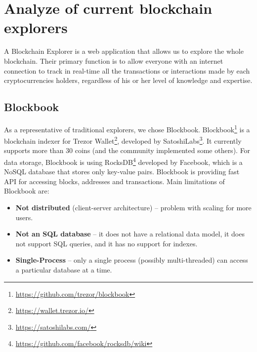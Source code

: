 \section{Analyze of current blockchain explorers}
A Blockchain Explorer is a web application that allows us to explore the whole blockchain. Their primary function is to allow everyone with an internet connection to track in real-time all the transactions or interactions made by each cryptocurrencies holders, regardless of his or her level of knowledge and expertise.\cite{laurence2019blockchain}\cite{dhillon2017blockchain}


\subsection{Blockbook}
As a representative of traditional explorers, we chose Blockbook. Blockbook\footnote{\url{https://github.com/trezor/blockbook}} is a blockchain indexer for Trezor Wallet\footnote{\url{https://wallet.trezor.io/}}, developed by SatoshiLabs\footnote{\url{https://satoshilabs.com/}}. It currently supports more than 30 coins (and the community implemented some others). For data storage, Blockbook is using RocksDB\footnote{\url{https://github.com/facebook/rocksdb/wiki}} developed by Facebook, which is a NoSQL database that stores only key-value pairs. Blockbook is providing fast API for accessing blocks, addresses and transactions. Main limitations of Blockbook are:
\begin{itemize}
    \item \textbf{Not distributed} (client-server architecture) -- problem with scaling for more users. 
    \item \textbf{Not an SQL database} -- it does not have a relational data model, it does not support SQL queries, and it has no support for indexes.
    \item \textbf{Single-Process} -- only a single process (possibly multi-threaded) can access a particular database at a time.
\end{itemize}